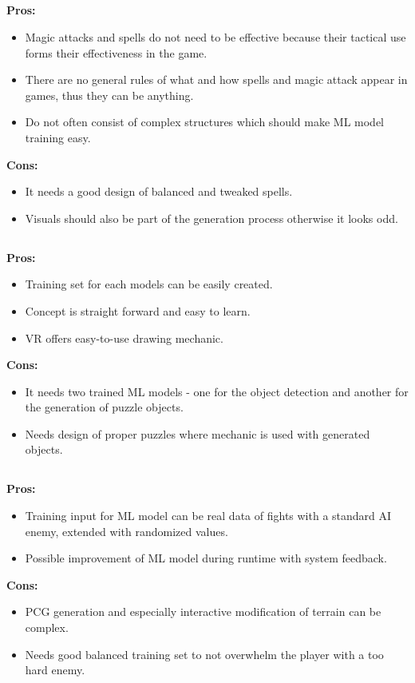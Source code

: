 \documentclass[MGS,Master,english]{twbook}%
\begin{document}
\subsection{}
\textbf{Pros:}
\begin{itemize}
	\item Magic attacks and spells do not need to be effective because their tactical use forms their effectiveness in the game.
	\item There are no general rules of what and how spells and magic attack appear in games, thus they can be anything.
	\item Do not often consist of complex structures  which should make ML model training easy.
\end{itemize}
\textbf{Cons:}
\begin{itemize}
	\item It needs a good design of balanced and tweaked spells.
	\item Visuals should also be part of the generation process otherwise it looks odd.
\end{itemize}

\subsection{}
\textbf{Pros:}
\begin{itemize}
	\item Training set for each models can be easily created.
	\item Concept is straight forward and easy to learn.
	\item \ac{VR} offers easy-to-use drawing mechanic.
\end{itemize}
\textbf{Cons:}
\begin{itemize}
	\item It needs two trained ML models - one for the object detection and another for the generation of puzzle objects. 
	\item Needs design of proper puzzles where mechanic is used with generated objects.
\end{itemize}

\subsection{}
\textbf{Pros:}
\begin{itemize}
	\item Training input for ML model can be real data of fights with a standard AI enemy, extended with randomized values.
	\item Possible improvement of ML model during runtime with system feedback.
\end{itemize}
\textbf{Cons:}
\begin{itemize}
	\item PCG generation and especially interactive modification of terrain can be complex.
	\item Needs good balanced training set to not overwhelm the player with a too hard enemy.
\end{itemize}
\end{document}
